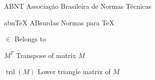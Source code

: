\begin{siglas}
    \item[ABNT] Associação Brasileira de Normas Técnicas
    \item[abnTeX] ABsurdas Normas para TeX
  \end{siglas}
  
  \begin{simbolos}
    \item[$ \in $] Belongs to 
    \item[$M^T$] Transpose of matrix $M$
    \item[$\operatorname{tril}(M)$] Lower triangle matrix of $M$
  \end{simbolos}